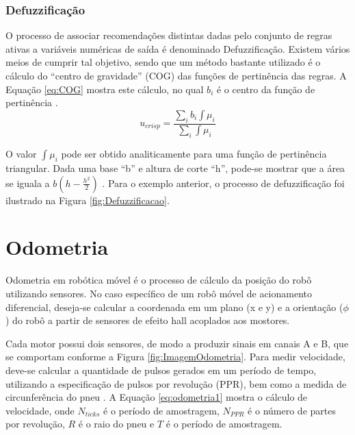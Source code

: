 	
	
	\subsubsection{Defuzzificação}
	
	O processo de associar recomendações distintas dadas pelo conjunto de regras
	ativas a variáveis numéricas de saída é denominado Defuzzificação. Existem
	vários meios de cumprir tal objetivo, sendo que um método bastante utilizado é
	o cálculo do ``centro de gravidade'' (COG) das funções de pertinência das
	regras. A Equação \ref{eq:COG} mostra este cálculo, no qual $b_i$ é o centro da
	função de pertinência \cite{fuzzy_passino}.
\begin{equation}
	\label{eq:COG}
	u_{crisp} = \frac{\sum_i b_i \int \mu_i}{\sum_i \int \mu_i}
\end{equation}

	O valor $\int \mu_i$ pode ser obtido analiticamente para uma função de
	pertinência triangular. Dada uma base ``b'' e altura de corte ``h'',
	pode-se mostrar que a área se iguala a $b(h-\frac{h^2}{2})$
	\cite{fuzzy_passino}. Para o exemplo anterior, o processo de defuzzificação foi
	ilustrado na Figura \ref{fig:Defuzzificacao}.
	
	
	
\section{Odometria}

Odometria em robótica móvel é o processo de cálculo da posição do robô
utilizando sensores. No caso específico de um robô móvel de acionamento
diferencial, deseja-se calcular a coordenada em um plano (x e y) e a 
orientação ($\phi$) do robô a partir de sensores de efeito hall acoplados
aos mostores. \cite{art:odometria1}

Cada motor possui dois sensores, de modo a produzir sinais em canais 
A e B, que se comportam conforme a Figura \ref{fig:ImagemOdometria}. Para medir velocidade, 
deve-se  calcular a quantidade de pulsos gerados em um período de tempo,
utilizando a especificação de pulsos por revolução (PPR), bem como a
medida de circunferência do pneu \cite{odometria2}. A Equação 
\ref{eq:odometria1} mostra o cálculo de velocidade, onde $N_{ticks}$
é o período de amostragem, $N_{PPR}$ é o número de partes por revolução,
$R$ é o raio do pneu e $T$ é o período de amostragem.


